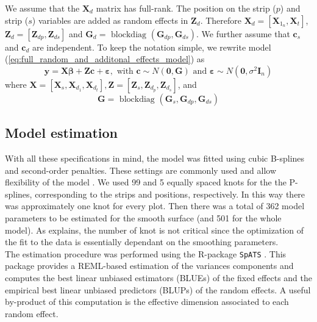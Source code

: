 We assume that the $\boldsymbol{X}_{d}$ matrix has full-rank. 
The position on the strip ($p$) and strip ($s$) variables are added as random effects in $\mathbf{Z}_{d}$. 
Therefore $\mathbf{X}_{d} = 
\left[ 
	\mathbf{X}_{1_n},\mathbf{X}_{t} 
\right]$, 
$\boldsymbol{Z}_{d}=
\left[
	\boldsymbol{Z}_{dp}, \boldsymbol{Z}_{ds}
\right]$ and 
$\boldsymbol{G}_{d}= 
\text{ blockdiag }
\left(
	\boldsymbol{G}_{dp}, \boldsymbol{G}_{ds}
\right)$. 
We further assume that $\boldsymbol{c}_s$ and $\boldsymbol{c}_d$ are independent.
To keep the notation simple, we rewrite model (\ref{eq:full_random_and_additonal_effects_model}) as
\begin{equation}
    \boldsymbol{y}=
    \boldsymbol{X} \boldsymbol{\beta}+
    \boldsymbol{Z} \boldsymbol{c}+
    \boldsymbol{\varepsilon}, 
    \text { with } 
    \boldsymbol{c} \sim N(\mathbf{0}, \boldsymbol{G}) 
    \text { and } 
    \boldsymbol{\varepsilon} \sim N\left(\mathbf{0}, \sigma^{2} \boldsymbol{I}_{n}\right)
\end{equation}
where $\boldsymbol{X}=
\left[
	\boldsymbol{X}_{s}, \boldsymbol{X}_{d_{1}}, \mathbf{X}_{d_{t}} 
\right], 
\boldsymbol{Z}=
\left[
	\boldsymbol{Z}_{s}, \boldsymbol{Z}_{d_{p}}, \mathbf{Z}_{d_{s}}
\right]$, and 
\begin{equation}
    \boldsymbol{G}=\text { blockdiag }\left(\boldsymbol{G}_{s}, \boldsymbol{G}_{dp}, \boldsymbol{G}_{ds} \right)
\end{equation}

\subsection{Model estimation}
With all these specifications in mind, the model was fitted using cubic B-splines and second-order penalties. These settings are commonly used and allow flexibility of the model \parencite{rodriguez-alvarez_correcting_2018,rodriguez-alvarez_spatial_2016,rodriguez-alvarez_fast_2015}. We used 99 and 5 equally spaced knots for the the P-splines, corresponding to the strips and positions, respectively. In this way there was approximately one knot for every plot. Then there was a total of 362 model parameters to be estimated for the smooth surface (and 501 for the whole model). As \textcite{rodriguez-alvarez_correcting_2018} explains, the number of knot is not critical since the optimization of the fit to the data is essentially dependant on the smoothing parameters.\\
The estimation procedure was performed using the R-package \texttt{SpATS} \parencite{rodriguez-alvarez_spats:_2016}. This package provides a REML-based estimation of the variances components and computes the best linear unbiased estimators (BLUEs) of the fixed effects and the empirical best linear unbiased predictors (BLUPs) of the random effects. A useful by-product of this computation is the effective dimension associated to each random effect.

